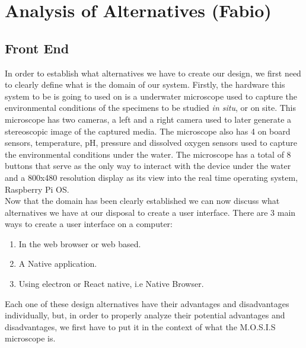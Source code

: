 \section{Analysis of Alternatives (Fabio)}
\subsection{Front End}
In order to establish what alternatives we have to create our design, we first need to clearly define what is the domain of our system. Firstly, the hardware this system to be is going to used on is a underwater microscope used to capture the environmental conditions of the specimens to be studied \textit{in situ}, or on site. This microscope has two cameras, a left and a right camera used to later generate a stereoscopic image of the captured media. The microscope also has 4 on board sensors, temperature, pH, pressure and dissolved oxygen sensors used to capture the environmental conditions under the water. The microscope has a total of 8 buttons that serve as the only way to interact with the device under the water and a 800x480 resolution display as its view into the real time operating system, Raspberry Pi OS.\\
Now that the domain has been clearly established we can now discuss what alternatives we have at our disposal to create a user interface. There are 3 main ways to create a user interface on a computer:
\begin{enumerate}
	\item In the web browser or web based.
	\item A Native application.
	\item Using electron or React native, i.e Native Browser.
\end{enumerate}
Each one of these design alternatives have their advantages and disadvantages individually, but, in order to properly analyze their potential advantages and disadvantages, we first have to put it in the context of what the M.O.S.I.S microscope is.\\

